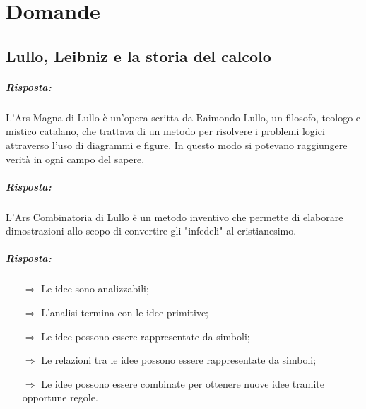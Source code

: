 \chapter{Domande}

\section{Lullo, Leibniz e la storia del calcolo}


\paragraph{Risposta:} L'Ars Magna di Lullo è un'opera scritta da Raimondo Lullo, un filosofo, teologo e mistico catalano,
che trattava di un metodo per risolvere i problemi logici attraverso l'uso di diagrammi e figure.
In questo modo si potevano raggiungere verità in ogni campo del sapere.

\subsubsection{}


\paragraph{Risposta:} L'Ars Combinatoria di Lullo è un metodo inventivo
che permette di elaborare dimostrazioni allo scopo di convertire gli "infedeli" al cristianesimo.   

\subsubsection{}


\paragraph{Risposta:}

\begin{itemize}
    \item [$\Rightarrow$] Le idee sono analizzabili;
    \item [$\Rightarrow$] L'analisi termina con le idee primitive;
    \item [$\Rightarrow$] Le idee possono essere rappresentate da simboli;
    \item [$\Rightarrow$] Le relazioni tra le idee possono essere rappresentate da simboli;
    \item [$\Rightarrow$] Le idee possono essere combinate per ottenere nuove idee tramite opportune regole.
\end{itemize}

